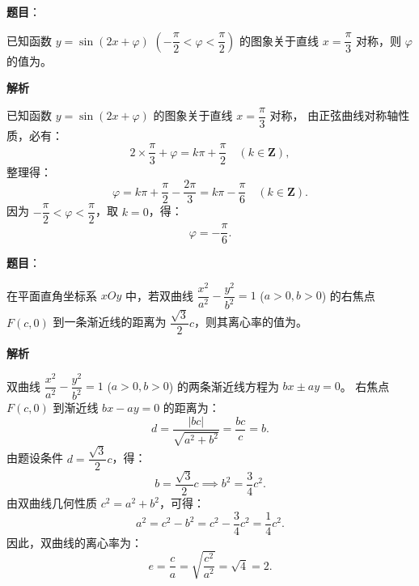 \begin{answer}

\textbf{题目}：

已知函数 $y = \sin(2x + \varphi)$ $\left(-\dfrac{\pi}{2} < \varphi < \dfrac{\pi}{2}\right)$ 的图象关于直线 $x = \dfrac{\pi}{3}$ 对称，则 $\varphi$ 的值为\gkblank{}。

\textbf{解析}

已知函数 $y = \sin(2x + \varphi)$ 的图象关于直线 $x = \dfrac{\pi}{3}$ 对称，
由正弦曲线对称轴性质，必有：
\nopagebreak[4]
\[2 \times \frac{\pi}{3} + \varphi = k\pi + \frac{\pi}{2}\quad (k \in \mathbf{Z}),\]
整理得：
\nopagebreak[4]
\[\varphi = k\pi + \frac{\pi}{2} - \frac{2\pi}{3} = k\pi - \frac{\pi}{6}\quad (k \in \mathbf{Z}).\]
因为 $-\dfrac{\pi}{2} < \varphi < \dfrac{\pi}{2}$，取 $k = 0$，得：
\nopagebreak[4]
\[\varphi = -\frac{\pi}{6}.\]


\end{answer}
\begin{answer}

\textbf{题目}：

在平面直角坐标系 $xOy$ 中，若双曲线 $\dfrac{x^2}{a^2} - \dfrac{y^2}{b^2} = 1$ ($a > 0, b > 0$) 的右焦点 $F(c, 0)$ 到一条渐近线的距离为 $\dfrac{\sqrt{3}}{2}c$，则其离心率的值为\gkblank{}。

\textbf{解析}

双曲线 $\dfrac{x^2}{a^2} - \dfrac{y^2}{b^2} = 1$ ($a > 0, b > 0$) 的两条渐近线方程为 $bx \pm ay = 0$。
右焦点 $F(c, 0)$ 到渐近线 $bx - ay = 0$ 的距离为：
\nopagebreak[4]
\[d = \frac{|bc|}{\sqrt{a^2 + b^2}} = \frac{bc}{c} = b.\]
由题设条件 $d = \dfrac{\sqrt{3}}{2}c$，得：
\nopagebreak[4]
\[b = \frac{\sqrt{3}}{2}c \implies b^2 = \frac{3}{4}c^2.\]
由双曲线几何性质 $c^2 = a^2 + b^2$，可得：
\nopagebreak[4]
\[a^2 = c^2 - b^2 = c^2 - \frac{3}{4}c^2 = \frac{1}{4}c^2.\]
因此，双曲线的离心率为：
\nopagebreak[4]
\[e = \frac{c}{a} = \sqrt{\frac{c^2}{a^2}} = \sqrt{4} = 2.\]


\end{answer}
